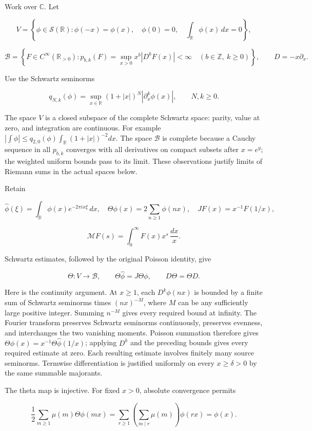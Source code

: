Work over \(\mathbb C\). Let

\[
V=\left\{\phi\in\mathcal S(\mathbb R):
\phi(-x)=\phi(x),\quad \phi(0)=0,\quad
\int_{\mathbb R}\phi(x)\,dx=0\right\},
\]

\[
\mathscr B=\left\{F\in C^\infty(\mathbb R_{>0}):
p_{b,k}(F)=\sup_{x>0}x^b|D^kF(x)|<\infty
\quad(b\in\mathbb Z,\ k\geq0)\right\},\qquad D=-x\partial_x.
\]

Use the Schwartz seminorms

\[q_{N,k}(\phi)=\sup_{x\in\mathbb R}(1+|x|)^N|\partial_x^k\phi(x)|,
\qquad N,k\geq0.\]

The space \(V\) is a closed subspace of the complete Schwartz space:
parity, value at zero, and integration are continuous. For example
\(|\int\phi|\leq q_{2,0}(\phi)\int_{\mathbb R}(1+|x|)^{-2}dx\). The
space \(\mathscr B\) is complete because a Cauchy sequence in all
\(p_{b,k}\) converges with all derivatives on compact subsets after
\(x=e^y\); the weighted uniform bounds pass to its limit. These
observations justify limits of Riemann sums in the actual spaces below.

Retain

\[
\widehat\phi(\xi)=\int_{\mathbb R}\phi(x)e^{-2\pi ix\xi}\,dx,
\quad \Theta\phi(x)=2\sum_{n\geq1}\phi(nx),
\quad JF(x)=x^{-1}F(1/x),
\]

\[\mathcal MF(s)=\int_0^\infty F(x)x^s\,\frac{dx}{x}.\]

Schwartz estimates, followed by the original Poisson identity, give

\[\Theta:V\longrightarrow\mathscr B,\qquad
\Theta\widehat\phi=J\Theta\phi,\qquad D\Theta=\Theta D.\]

Here is the continuity argument. At \(x\geq1\), each \(D^k\phi(nx)\) is
bounded by a finite sum of Schwartz seminorms times \((nx)^{-M}\), where
\(M\) can be any sufficiently large positive integer. Summing \(n^{-M}\)
gives every required bound at infinity. The Fourier transform preserves
Schwartz seminorms continuously, preserves evenness, and interchanges
the two vanishing moments. Poisson summation therefore gives
\(\Theta\phi(x)=x^{-1}\Theta\widehat\phi(1/x)\); applying \(D^k\) and
the preceding bounds gives every required estimate at zero. Each
resulting estimate involves finitely many source seminorms. Termwise
differentiation is justified uniformly on every \(x\geq\delta>0\) by the
same summable majorants.

The theta map is injective. For fixed \(x>0\), absolute convergence
permits

\[
\frac12\sum_{m\geq1}\mu(m)\Theta\phi(mx)
=\sum_{r\geq1}\left(\sum_{m\mid r}\mu(m)\right)\phi(rx)=\phi(x).
\]


